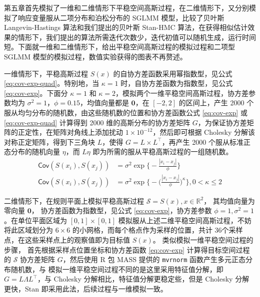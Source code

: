 \documentclass[12pt,a4paper,UTF8,twoside]{book}
\begin{document}
第五章首先模拟了一维和二维情形下平稳空间高斯过程，在二维情形下，又分别模拟了响应变量服从二项分布和泊松分布的
SGLMM 模型，比较了贝叶斯 Langevin-Hastings 算法和我们提出的贝叶斯
Stan-HMC
算法，在获得相似估计效果的情形下，我们提出的算法所需迭代次数少，迭代初值可以随机生成，运行时间短。下面就一维和二维情形下，给出平稳空间高斯过程的模拟过程和二项型
SGLMM 模型的模拟过程，数值实验获得的图表不再赘述。

一维情形下，平稳高斯过程 \(S(x)\) 的自协方差函数采用幂指数型，见公式
\eqref{eq:cov-exp-quad}。特别地，当 \(\kappa =1\)
时，自协方差函数为指数型，见公式 \eqref{eq:cov-exp}。下面分 \(\kappa =1\)
和 \(\kappa =2\)，模拟两个一维平稳空间高斯过程，协方差参数均为
\(\sigma^2 = 1\)，\(\phi = 0.15\)，均值向量都是 \(\mathbf{0}\)，在
\([-2,2]\) 的区间上，产生 2000
个服从均匀分布的随机数，由这些随机数的位置和协方差函数公式
\eqref{eq:cov-exp} 或 \eqref{eq:cov-exp-quad} 计算得到 2000
维的高斯分布的协方差矩阵
\(G\)，为保证协方差矩阵的正定性，在矩阵对角线上添加扰动
\(1 \times 10^{-12}\)，然后即可根据 Cholesky
分解该对称正定矩阵，得到下三角块 \(L\)，使得
\(G = L \times L^{\top}\)，再产生 2000 个服从标准正态分布的随机向量
\(\eta\)，而 \(L\eta\) 即为所需的服从平稳高斯过程的一组随机数。
\begin{align}
\mathsf{Cov}(S(x_i), S(x_j)) & = \sigma^2 \exp\big\{ - \frac{|x_{i} - x_{j}|}{ \phi } \big\}  \label{eq:cov-exp} \\
\mathsf{Cov}(S(x_i), S(x_j)) & = \sigma^2 \exp\big\{ -\big( \frac{ |x_{i} - x_{j}| }{ \phi } \big) ^ {\kappa} \big\}, 0 < \kappa \leq 2  \label{eq:cov-exp-quad} 
\end{align}

二维情形下，在规则平面上模拟平稳高斯过程
\(\mathcal{S} = S(x), x \in \mathbb{R}^2\)， 其均值向量为零向量
\(\mathbf{0}\)， 协方差函数为指数型，见公式 \eqref{eq:cov-exp}，协方差参数
\(\phi = 1, \sigma^2 = 1\)。在单位平面区域为 \([0,1] \times [0,1]\)
模拟服从上述二维平稳空间高斯过程，不妨将此区域划分为 \(6 \times 6\)
的小网格，而每个格点作为采样的位置，共计
36个采样点，在这些采样点上的观察值即为目标值 \(S(x)\)。
类似模拟一维平稳空间过程的步骤， 首先根据采样点位置坐标和协方差函数
\eqref{eq:cov-exp} 计算得目标空间过程的 \(\mathcal{S}\) 协方差矩阵
\(G\)，然后使用 R 包 MASS 提供的 \texttt{mvrnorm}
函数产生多元正态分布随机数，与
模拟一维平稳空间过程不同的是这里采用特征值分解，即
\(G = L\Lambda L^{\top}\)，与 Cholesky
分解相比，特征值分解更稳定些，但是 Cholesky 分解更快，Stan
即采用此法，后续过程与一维模拟一致。
\end{document}
